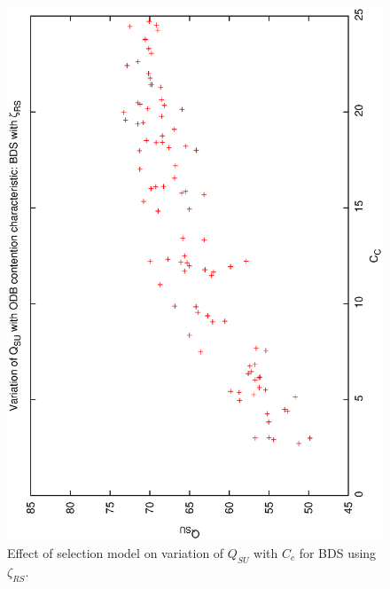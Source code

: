 \begin{figure}[h]

\begin{center}
 \includegraphics[scale=0.5, angle=-90]{figures/qsucc_biasrs.eps}
 \caption[Effect of selection model on variation of $Q_{SU}$ with $C_c$ for BDS using $\zeta_{RS}$.] 
   {Effect of selection model on variation of $Q_{SU}$ with $C_c$ for BDS using $\zeta_{RS}$.} 
\label{fig:qsucc_biasrs}
\end{center}
\end{figure}

